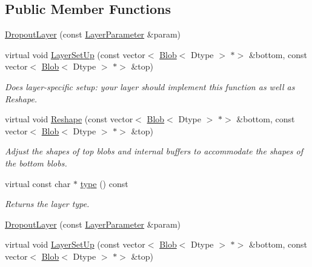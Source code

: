 \subsection*{Public Member Functions}
\begin{DoxyCompactItemize}
\item 
\mbox{\hyperlink{classcaffe_1_1_dropout_layer_a24cbddd4699b102a9555d3b8013c16d0}{Dropout\+Layer}} (const \mbox{\hyperlink{classcaffe_1_1_layer_parameter}{Layer\+Parameter}} \&param)
\item 
virtual void \mbox{\hyperlink{classcaffe_1_1_dropout_layer_addcfd0822c1c5e3591bc7001a034b167}{Layer\+Set\+Up}} (const vector$<$ \mbox{\hyperlink{classcaffe_1_1_blob}{Blob}}$<$ Dtype $>$ $\ast$$>$ \&bottom, const vector$<$ \mbox{\hyperlink{classcaffe_1_1_blob}{Blob}}$<$ Dtype $>$ $\ast$$>$ \&top)
\begin{DoxyCompactList}\small\item\em Does layer-\/specific setup\+: your layer should implement this function as well as Reshape. \end{DoxyCompactList}\item 
virtual void \mbox{\hyperlink{classcaffe_1_1_dropout_layer_a8ddbd583b7430f228506954910935505}{Reshape}} (const vector$<$ \mbox{\hyperlink{classcaffe_1_1_blob}{Blob}}$<$ Dtype $>$ $\ast$$>$ \&bottom, const vector$<$ \mbox{\hyperlink{classcaffe_1_1_blob}{Blob}}$<$ Dtype $>$ $\ast$$>$ \&top)
\begin{DoxyCompactList}\small\item\em Adjust the shapes of top blobs and internal buffers to accommodate the shapes of the bottom blobs. \end{DoxyCompactList}\item 
\mbox{\label{classcaffe_1_1_dropout_layer_a95456634a033d94c23ef0db3679ccbc9}} 
virtual const char $\ast$ \mbox{\hyperlink{classcaffe_1_1_dropout_layer_a95456634a033d94c23ef0db3679ccbc9}{type}} () const
\begin{DoxyCompactList}\small\item\em Returns the layer type. \end{DoxyCompactList}\item 
\mbox{\hyperlink{classcaffe_1_1_dropout_layer_a24cbddd4699b102a9555d3b8013c16d0}{Dropout\+Layer}} (const \mbox{\hyperlink{classcaffe_1_1_layer_parameter}{Layer\+Parameter}} \&param)
\item 
virtual void \mbox{\hyperlink{classcaffe_1_1_dropout_layer_aaf3f194d0e4936f7a657b61d7468d744}{Layer\+Set\+Up}} (const vector$<$ \mbox{\hyperlink{classcaffe_1_1_blob}{Blob}}$<$ Dtype $>$ $\ast$$>$ \&bottom, const vector$<$ \mbox{\hyperlink{classcaffe_1_1_blob}{Blob}}$<$ Dtype $>$ $\ast$$>$ \&top)

\end{DoxyCompactItemize}
